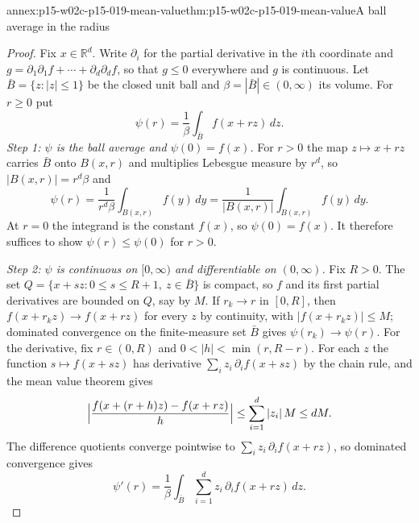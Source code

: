 \begin{annexitem}{annex:p15-w02c-p15-019-mean-value}{thm:p15-w02c-p15-019-mean-value}{A ball average in the radius}
\begin{proof}
Fix \(x\in\mathbb R^d\). Write \(\partial_i\) for the partial derivative
in the \(i\)th coordinate and
\(g=\partial_1\partial_1f+\cdots+\partial_d\partial_df\), so that
\(g\leq0\) everywhere and \(g\) is continuous. Let
\(\bar B=\{z:|z|\leq1\}\) be the closed unit ball and
\(\beta=|\bar B|\in(0,\infty)\) its volume. For \(r\geq0\) put
\[
            \psi(r)=\frac1\beta\int_{\bar B}f(x+rz)\,dz .
\]
\emph{Step 1: \(\psi\) is the ball average and \(\psi(0)=f(x)\).} For
\(r>0\) the map \(z\mapsto x+rz\) carries \(\bar B\) onto
\(B(x,r)\) and multiplies Lebesgue measure by \(r^d\), so
\(|B(x,r)|=r^d\beta\) and
\[
     \psi(r)=\frac1{r^d\beta}\int_{B(x,r)}f(y)\,dy
            =\frac1{|B(x,r)|}\int_{B(x,r)}f(y)\,dy .
\]
At \(r=0\) the integrand is the constant \(f(x)\), so \(\psi(0)=f(x)\).
It therefore suffices to show \(\psi(r)\leq\psi(0)\) for \(r>0\).

\emph{Step 2: \(\psi\) is continuous on \([0,\infty)\) and
differentiable on \((0,\infty)\).} Fix \(R>0\). The set
\(Q=\{x+sz:0\leq s\leq R+1,\ z\in\bar B\}\) is compact, so \(f\) and
its first partial derivatives are bounded on \(Q\), say by \(M\). If
\(r_k\to r\) in \([0,R]\), then \(f(x+r_kz)\to f(x+rz)\) for every
\(z\) by continuity, with \(|f(x+r_kz)|\leq M\); dominated convergence
on the finite-measure set \(\bar B\) gives \(\psi(r_k)\to\psi(r)\). For
the derivative, fix \(r\in(0,R)\) and \(0<|h|<\min(r,R-r)\). For each
\(z\) the function \(s\mapsto f(x+sz)\) has derivative
\(\sum_i z_i\,\partial_if(x+sz)\) by the chain rule, and the mean value
theorem gives
\[
   \Bigl|\frac{f(x+(r+h)z)-f(x+rz)}h\Bigr|\leq\sum_{i=1}^d|z_i|\,M\leq dM .
\]
The difference quotients converge pointwise to
\(\sum_iz_i\,\partial_if(x+rz)\), so dominated convergence gives
\[
   \psi'(r)=\frac1\beta\int_{\bar B}\sum_{i=1}^dz_i\,\partial_if(x+rz)\,dz .
\]


\end{proof}
\end{annexitem}
